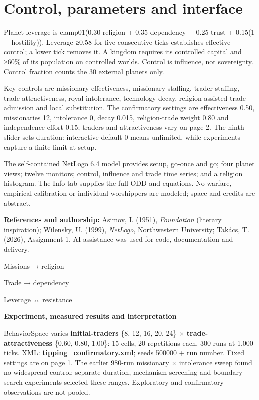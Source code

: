 \documentclass[10pt,a4paper]{article}
\newcommand{\reporttitle}[1]{{\Large\bfseries\color{teal}#1\par}\vspace{3pt}}
\begin{document}
\section*{Control, parameters and interface}

Planet leverage is clamp01(0.30 religion + 0.35 dependency + 0.25 trust + 0.15(1 − hostility)). Leverage ≥0.58 for five consecutive ticks establishes effective control; a lower tick removes it. A kingdom requires its controlled capital and ≥60\% of its population on controlled worlds. Control is influence, not sovereignty. Control fraction counts the 30 external planets only.


Key controls are missionary effectiveness, missionary staffing, trader staffing, trade attractiveness, royal intolerance, technology decay, religion-assisted trade admission and local substitution. The confirmatory settings are effectiveness 0.50, missionaries 12, intolerance 0, decay 0.015, religion-trade weight 0.80 and independence effort 0.15; traders and attractiveness vary on page 2. The ninth slider sets duration: interactive default 0 means unlimited, while experiments capture a finite limit at setup.


The self-contained NetLogo 6.4 model provides setup, go-once and go; four planet views; twelve monitors; control, influence and trade time series; and a religion histogram. The Info tab supplies the full ODD and equations. No warfare, empirical calibration or individual worshippers are modeled; space and credits are abstract.


{\footnotesize \textbf{References and authorship:} Asimov, I. (1951), \emph{Foundation} (literary inspiration); Wilensky, U. (1999), \emph{NetLogo}, Northwestern University; Takács, T. (2026), Assignment 1. AI assistance was used for code, documentation and delivery.\par}

\vspace{6pt}
\noindent
\colorbox{pale}{\parbox[c][7mm][c]{0.30\linewidth}{\centering\footnotesize\color{teal}Missions → religion}}\hfill
\colorbox{pale}{\parbox[c][7mm][c]{0.30\linewidth}{\centering\footnotesize\color{teal}Trade → dependency}}\hfill
\colorbox{pale}{\parbox[c][7mm][c]{0.30\linewidth}{\centering\footnotesize\color{teal}Leverage ↔ resistance}}
\newpage
\reporttitle{Experiment, measured results and interpretation}
\fontsize{9}{11}\selectfont


BehaviorSpace varies \textbf{initial-traders} \{8, 12, 16, 20, 24\} × \textbf{trade-attractiveness} \{0.60, 0.80, 1.00\}: 15 cells, 20 repetitions each, 300 runs at 1,000 ticks. XML: \textbf{tipping\_confirmatory.xml}; seeds 500000 + run number. Fixed settings are on page 1. The earlier 980-run missionary × intolerance sweep found no widespread control; separate duration, mechanism-screening and boundary-search experiments selected these ranges. Exploratory and confirmatory observations are not pooled.
\end{document}
